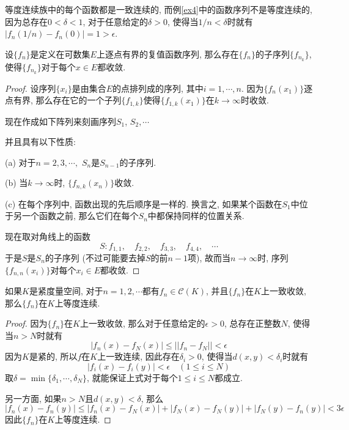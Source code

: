 \documentclass[cn,12pt,math=mtpro2,citestyle=gb7714-2015,bibstyle=gb7714-2015,twocol]{elegantbook}
\begin{document}
等度连续族中的每个函数都是一致连续的, 而例\ref{ex4}中的函数序列不是等度连续的, 因为总存在$0<\delta< 1$, 对于任意给定的$\delta>0$, 使得当$1/n<\delta$时就有$|f_n(1/n)-f_n(0)|=1>\epsilon$.
\begin{theorem}\label{thm:th7.4}
  设$\{f_n\}$是定义在可数集$E$上逐点有界的复值函数序列, 那么存在$\{f_n\}$的子序列$\{f_{n_k}\}$, 使得$\{f_{n_k}\}$对于每个$x\in E$都收敛.
\end{theorem}
\begin{proof}
  设序列$\{x_i\}$是由集合$E$的点排列成的序列, 其中$i=1,\cdots,n$. 因为$\{f_n(x_1)\}$逐点有界, 那么存在它的一个子列$\{f_{1,k}\}$使得$\{f_ {1,k}(x_1)\}$在$k\to\infty$时收敛.

  现在作成如下阵列来刻画序列$S_1$, $S_2, \cdots$
\begin{center}
\end{center}
并且具有以下性质:

(a) 对于$n=2,3,\cdots,$ $S_n$是$S_{n-1}$的子序列.

(b) 当$k\to\infty$时, $\{f_{n,k}(x_n)\}$收敛.

(c) 在每个序列中, 函数出现的先后顺序是一样的. 换言之, 如果某个函数在$S_1$中位于另一个函数之前, 那么它们在每个$S_n$中都保持同样的位置关系.

现在取对角线上的函数
$$S: f_{1,1},\quad f_{2,2},\quad f_{3,3},\quad f_{4,4},\quad\cdots$$
于是$S$是$S_n$的子序列 (不过可能要去掉$S$的前$n-1$项), 故而当$n\to\infty$时, 序列$\{f_{n,n}(x_i)\}$对每个$x_i\in E$都收敛.

\end{proof}
\begin{theorem}
 如果$K$是紧度量空间, 对于$n=1,2,\cdots$都有$f_n\in\mathscr{C}(K)$, 并且$\{f_n\}$在$K$上一致收敛, 那么$\{f_n\}$在$K$上等度连续.
\end{theorem}
\begin{proof}
  因为$\{f_n\}$在$K$上一致收敛, 那么对于任意给定的$\epsilon>0$, 总存在正整数$N$, 使得当$n>N$时就有
  $$ |f_n(x)-f_N(x)|\leq  ||f_n-f_N||<\epsilon$$
  因为$K$是紧的, 所以$f$在$K$上一致连续, 因此存在$\delta_i>0$, 使得当$d(x,y)<\delta_i$时就有
  $$|f_i(x)-f_i(y)|<\epsilon\quad (1\leq i\leq N)$$
  取$\delta=\min\{\delta_1,\cdots,\delta_N\}$, 就能保证上式对于每个$1\leq i\leq N$都成立.

  另一方面, 如果$n>N$且$d(x,y)<\delta$, 那么
  $$|f_n(x)-f_n(y)|\leq |f_n(x)-f_N(x)|+|f_N(x)-f_N(y)|+|f_N(y)-f_n(y)|<3\epsilon$$
  因此$\{f_n\}$在$K$上等度连续.
\end{proof}
\end{document}
